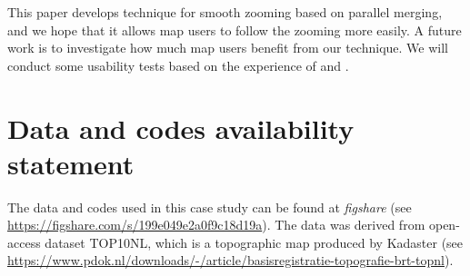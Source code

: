 \documentclass[]{interact}
\begin{document}
This paper develops technique for smooth zooming based on parallel merging,
and we hope that it allows map users to follow the zooming more easily.
A future work is to investigate 
how much map users benefit from our technique.
We will conduct some usability tests based on the experience of
\citet[]{Suba2017Thesis} and \citet{Midtbo2007}.
















\section*{Data and codes availability statement}

The data and codes used in this case study 
can be found at \emph{figshare} 
(see \url{https://figshare.com/s/199e049e2a0f9c18d19a}).
The data was derived from open-access dataset TOP10NL,
which is a topographic map produced by Kadaster
(see \url{https://www.pdok.nl/downloads/-/article/basisregistratie-topografie-brt-topnl}).
\end{document}
